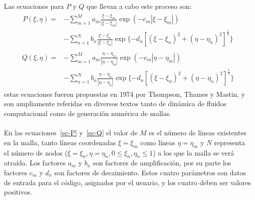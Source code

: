 \documentclass[letterpaper, openright, 12pt]{book}
\begin{document}
    \paragraph*{}
    Las ecuaciones para $P$ y $Q$ que llevan a cabo este proceso son:
    \begin{align}
        \begin{aligned}
            P(\xi, \eta) =& - \sum_{m = 1}^{M} a_{m} \frac{\xi - \xi_{m}}{|\xi - \xi_{m}|} \exp(-c_{m}|\xi - \xi_{m}|) \\&
            - \sum_{n=1}^{N} b_{n} \frac{\xi - \xi_{n}}{| \xi - \xi_{n} |} \exp\lbrace -d_{n} \left[ \left( \xi - \xi_{n} \right)^2 + \left( \eta - \eta_{n} \right)^2 \right]^\frac{1}{2} \rbrace
        \end{aligned}
        \label{ec-P}
    \end{align}
    \begin{align}
        \begin{aligned}
            Q(\xi, \eta) =& - \sum_{m = 1}^{M} a_{m} \frac{\eta - \eta_{m}}{|\eta - \eta_{m}|} \exp(-c_{m}|\eta - \eta_{m}|) \\&
            - \sum_{n=1}^{N} b_{n} \frac{\eta - \eta_{n}}{| \eta - \eta_{n} |} \exp\lbrace -d_{n} \left[ \left( \xi - \xi_{n} \right)^2 + \left( \eta - \eta_{n} \right)^2 \right]^\frac{1}{2} \rbrace
        \end{aligned}
        \label{ec-Q}
    \end{align}
    estas ecuaciones fueron propuestas en 1974 por Thompson, Thames y
    Mastin\cite{thompson1974automatic}, y son ampliamente referidas en
    diversos textos tanto de dinámica de fluidos computacional como de
    generación numérica de mallas.

    \paragraph*{}
    En las ecuaciones~\ref{ec-P} y~\ref{ec-Q} el valor de $M$ es el número
    de líneas existentes en la malla, tanto líneas coordenadas
    $\xi = \xi_{m}$ como líneas $\eta = \eta_{m}$ y $N$ representa el número
    de nodos ($\xi = \xi_{n}, \eta = \eta_{n}, 0 \leq \xi_{n}, \eta_{n} \leq 1$)
    a los que la malla se verá atraída. Los factores $a_{m}$ y $b_{n}$ son
    factores de amplificación, por su parte los factores $c_{m}$ y $d_{n}$
    son factores de decaimiento. Estos cuatro parámetros son datos de entrada
    para el código, asignados por el usuario, y los cuatro deben ser valores
    positivos.
\end{document}
